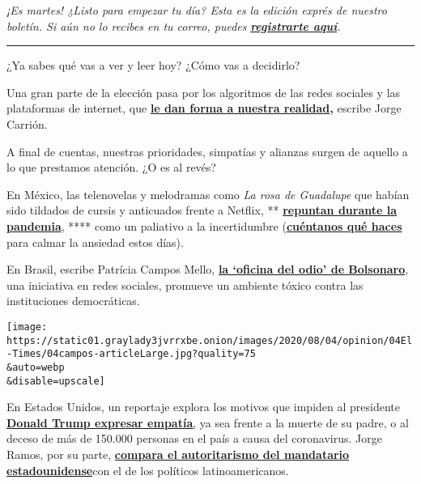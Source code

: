 \emph{¡Es martes! ¿Listo para empezar tu día? Esta es la edición exprés
de nuestro boletín. Si aún no lo recibes en tu correo, puedes}
\textbf{\href{https://www.nytimes3xbfgragh.onion/newsletters/el-times}{\emph{registrarte
aquí}}}\emph{.}

\begin{center}\rule{0.5\linewidth}{\linethickness}\end{center}

¿Ya sabes qué vas a ver y leer hoy? ¿Cómo vas a decidirlo?

Una gran parte de la elección pasa por los algoritmos de las redes
sociales y las plataformas de internet, que
\textbf{\href{https://www.nytimes3xbfgragh.onion/es/2020/08/02/espanol/opinion/facebook-amazon-instagram.html}{le
dan forma a nuestra realidad},} escribe Jorge Carrión.

A final de cuentas, nuestras prioridades, simpatías y alianzas surgen de
aquello a lo que prestamos atención. ¿O es al revés?

En México, las telenovelas y melodramas como \emph{La rosa de Guadalupe}
que habían sido tildados de cursis y anticuados frente a Netflix, **
\textbf{\href{https://www.nytimes3xbfgragh.onion/es/2020/08/02/espanol/america-latina/televisa-rosa-de-guadalupe-netflix.html}{repuntan
durante la pandemia}}, **** como un paliativo a la incertidumbre
(\textbf{\href{https://www.nytimes3xbfgragh.onion/es/2020/08/02/espanol/america-latina/televisa-rosa-de-guadalupe-netflix.html\#commentsContainer}{cuéntanos
qué haces}} para calmar la ansiedad estos días).

En Brasil, escribe Patrícia Campos Mello,
\textbf{\href{https://www.nytimes3xbfgragh.onion/es/2020/08/04/espanol/opinion/bolsonaro-oficina-odio-brasil.html}{la
`oficina del odio' de Bolsonaro}}, una iniciativa en redes sociales,
promueve un ambiente tóxico contra las instituciones democráticas.

\texttt{[image: https://static01.graylady3jvrrxbe.onion/images/2020/08/04/opinion/04El-Times/04campos-articleLarge.jpg?quality=75\\\&auto=webp\\\&disable=upscale]}

En Estados Unidos, un reportaje explora los motivos que impiden al
presidente
\textbf{\href{https://www.nytimes3xbfgragh.onion/es/2020/07/31/espanol/estados-unidos/fred-trump-donald-trump.html}{Donald
Trump expresar
empatía}}\href{https://www.nytimes3xbfgragh.onion/es/2020/07/31/espanol/estados-unidos/fred-trump-donald-trump.html}{,}
ya sea frente a la muerte de su padre, o al deceso de más de 150.000
personas en el país a causa del coronavirus. Jorge Ramos, por su parte,
\textbf{\href{https://www.nytimes3xbfgragh.onion/es/2020/08/01/espanol/opinion/trump-autoritarismo.html}{compara
el autoritarismo del mandatario
estadounidense}}\href{https://www.nytimes3xbfgragh.onion/es/2020/08/01/espanol/opinion/trump-autoritarismo.html}{}con
el de los políticos latinoamericanos.

